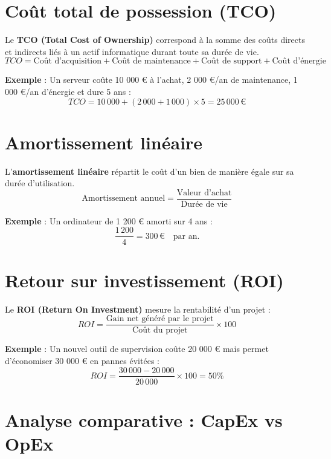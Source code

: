 \documentclass[12pt,a4paper]{report}
\begin{document}
\section*{Coût total de possession (TCO)}

\begin{tcolorbox}[title={Définition}]
Le \textbf{TCO (Total Cost of Ownership)} correspond à la somme des coûts directs et indirects liés à un actif informatique durant toute sa durée de vie.
\[
TCO = \text{Coût d’acquisition} + \text{Coût de maintenance} + \text{Coût de support} + \text{Coût d’énergie}
\]
\end{tcolorbox}

\textbf{Exemple} :  
Un serveur coûte 10 000 € à l’achat, 2 000 €/an de maintenance, 1 000 €/an d’énergie et dure 5 ans :
\[
TCO = 10\,000 + (2\,000 + 1\,000) \times 5 = 25\,000 \,€
\]

\section*{Amortissement linéaire}

\begin{tcolorbox}[title={Définition}]
L’\textbf{amortissement linéaire} répartit le coût d’un bien de manière égale sur sa durée d’utilisation.
\[
\text{Amortissement annuel} = \frac{\text{Valeur d’achat}}{\text{Durée de vie}}
\]
\end{tcolorbox}

\textbf{Exemple} :  
Un ordinateur de 1 200 € amorti sur 4 ans :
\[
\frac{1\,200}{4} = 300 \,€ \quad \text{par an.}
\]

\section*{Retour sur investissement (ROI)}

\begin{tcolorbox}[title={Définition}]
Le \textbf{ROI (Return On Investment)} mesure la rentabilité d’un projet :
\[
ROI = \frac{\text{Gain net généré par le projet}}{\text{Coût du projet}} \times 100
\]
\end{tcolorbox}

\textbf{Exemple} :  
Un nouvel outil de supervision coûte 20 000 € mais permet d’économiser 30 000 € en pannes évitées :
\[
ROI = \frac{30\,000 - 20\,000}{20\,000} \times 100 = 50\%
\]

\section*{Analyse comparative : CapEx vs OpEx}
\end{document}
